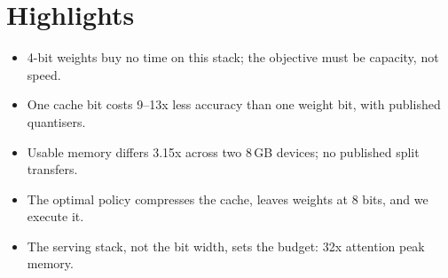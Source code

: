 \section*{Highlights}
\begin{itemize}
\item 4-bit weights buy no time on this stack; the objective must be capacity, not speed.
\item One cache bit costs 9--13x less accuracy than one weight bit, with published quantisers.
\item Usable memory differs 3.15x across two 8\,GB devices; no published split transfers.
\item The optimal policy compresses the cache, leaves weights at 8 bits, and we execute it.
\item The serving stack, not the bit width, sets the budget: 32x attention peak memory.
\end{itemize}
